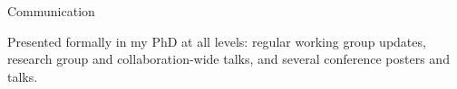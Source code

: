 \begin{cventries}
    \cventry
    {} %
    {Communication} %
    {} %
    {} %
    {
      \begin{cvitems}
        \item {Presented formally in my PhD at all levels: regular working group updates, research group and collaboration-wide talks, and several conference posters and talks.}
        \end{cvitems}
    }

\end{cventries}


